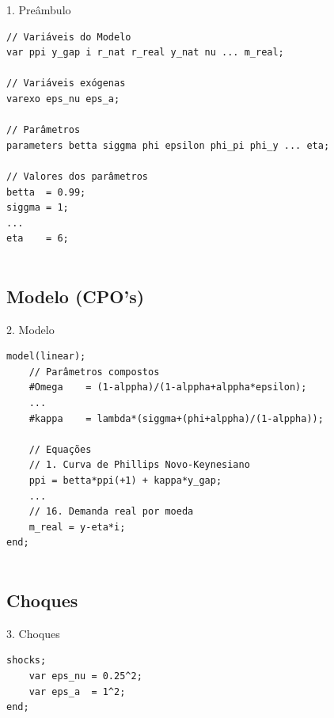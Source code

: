 \documentclass[xcolor=pdftex,dvipsnames,table]{beamer}
\newcommand{\ft}{\frametitle}
\begin{document}
\begin{frame}[fragile]

\begin{block}{1. Preâmbulo}

	\begin{lstlisting}
// Variáveis do Modelo
var ppi y_gap i r_nat r_real y_nat nu ... m_real;     
		
// Variáveis exógenas
varexo eps_nu eps_a;

// Parâmetros
parameters betta siggma phi epsilon phi_pi phi_y ... eta;

// Valores dos parâmetros
betta  = 0.99;
siggma = 1;
...
eta    = 6;
	
	\end{lstlisting}

\end{block}

\end{frame}


\subsection{Modelo (CPO's)}

\begin{frame}[fragile]
\begin{block}{2. Modelo}
	\begin{lstlisting}
model(linear);
	// Parâmetros compostos
	#Omega    = (1-alppha)/(1-alppha+alppha*epsilon);
	...
	#kappa    = lambda*(siggma+(phi+alppha)/(1-alppha));
	
	// Equações
	// 1. Curva de Phillips Novo-Keynesiano
	ppi = betta*ppi(+1) + kappa*y_gap;
	...
	// 16. Demanda real por moeda
	m_real = y-eta*i;
end;
	
	\end{lstlisting}

\end{block}
\end{frame}

\subsection{Choques}

\begin{frame}[fragile]
\begin{block}{3. Choques}
	\begin{lstlisting}
shocks;
	var eps_nu = 0.25^2; 
	var eps_a  = 1^2; 
end;	
	\end{lstlisting}
\end{block}

\end{frame}
\end{document}
